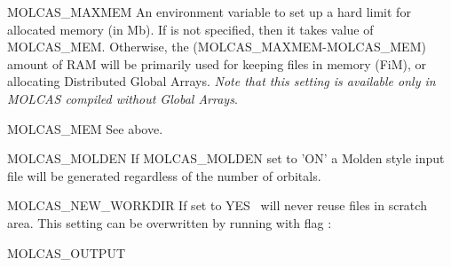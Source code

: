 \begin{variablelist}
\item[MOLCAS\_MAXMEM]
An environment variable to set up a hard limit for allocated memory (in Mb).
If is not specified, then it takes value of MOLCAS\_MEM. Otherwise, the (MOLCAS\_MAXMEM-MOLCAS\_MEM)
amount of RAM will be primarily used for keeping files in memory (FiM), or allocating Distributed Global Arrays.
{\it Note that this setting is available only in MOLCAS compiled without Global Arrays}.
\item[MOLCAS\_MEM]
See above.
\item[MOLCAS\_MOLDEN]
If MOLCAS\_MOLDEN set to 'ON' a Molden style input file will be generated regardless of the number of orbitals.
\item[MOLCAS\_NEW\_WORKDIR]
If set to YES \molcas\ will never reuse files in scratch area.
This setting can be overwritten by running  with flag :
\item[MOLCAS\_OUTPUT]

\end{variablelist}
